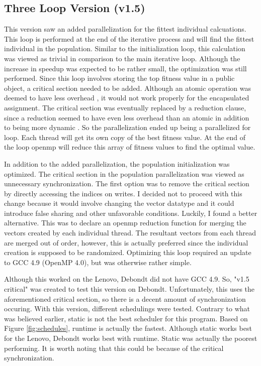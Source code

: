 \documentclass[10pt,letterpaper]{article}
\begin{document}
\subsection{Three Loop Version (v1.5)} 
This version saw an added parallelization for the fittest individual calcuations. This loop is performed at the end of the iterative process and will find the fittest individual in the population. Similar to the initialization loop, this calculation was viewed as trivial in comparison to the main iterative loop. Although the increase in speedup was expected to be rather small, the optimization was still performed. Since this loop involves storing the top fitness value in a public object, a critical section needed to be added. Although an atomic operation was deemed to have less overhead \cite{atomicoverhead}, it would not work properly for the encapsulated assignment. The critical section was eventually replaced by a reduction clause, since a reduction seemed to have even less overhead than an atomic in addition to being more dynamic \cite{suss2008common}. So the parallelization ended up being a parallelized for loop. Each thread will get its own copy of the best fitness value. At the end of the loop openmp will reduce this array of fitness values to find the optimal value.
 
In addition to the added parallelization, the population initialization was optimized. The critical section in the population parallelization was viewed as unnecessary synchronization. The first option was to remove the critical section by directly accessing the indices on writes. I decided not to proceed with this change because it would involve changing the vector datatype and it could introduce false sharing and other unfavorable conditions. Luckily, I found a better alternative. This was to declare an openmp reduction function for merging the vectors created by each individual thread. The resultant vectors from each thread are merged out of order, however, this is actually preferred since the individual creation is supposed to be randomized. Optimizing this loop required an update to GCC 4.9 (OpenMP 4.0), but was otherwise rather simple.

Although this worked on the Lenovo, Debondt did not have GCC 4.9. So, "v1.5 critical" was created to test this version on Debondt. Unfortunately, this uses the aforementioned critical section, so there is a decent amount of synchronization occuring. With this version, different schedulings were tested. Contrary to what was believed earlier, static is not the best scheduler for this program. Based on Figure \ref{fig:schedules}, runtime is actually the fastest. Although static works best for the Lenovo, Debondt works best with runtime. Static was actually the poorest performing. It is worth noting that this could be because of the critical synchronization. 
\end{document}

